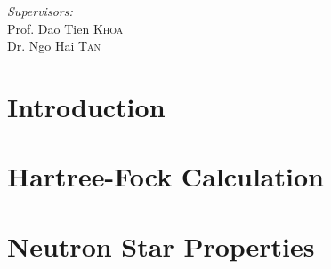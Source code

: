 \documentclass[a4paper,12pt]{report}
\theoremstyle{plain}\newtheorem{ques}{Question}
\theoremstyle{definition}\newtheorem*{ans}{Answer}
\begin{document}
\begin{titlepage}
                \begin{minipage}[t]{0.3\textwidth}
                        \begin{flushright}
                                \emph{Supervisors:}\\
                                Prof. Dao Tien \textsc{Khoa}\\
                                Dr. Ngo Hai \textsc{Tan}
                        \end{flushright}
                \end{minipage}
                \vfill
                {\large \thedate\par}
        \end{titlepage}  
        
        \restoregeometry
        \tableofcontents

        \printglossary[title={List of Abbreviations}]

        \chapter{Introduction}
        

        \chapter{Hartree-Fock Calculation}
        

        \chapter{Neutron Star Properties}
        

        \clearpage
        
        
\end{document}
